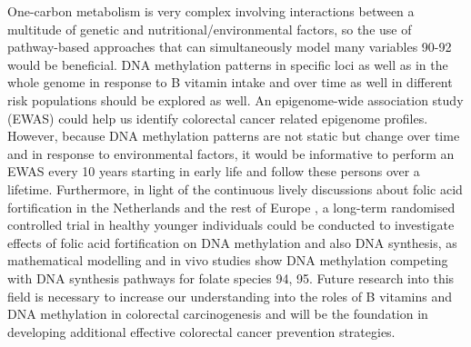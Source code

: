 \noindent One-carbon metabolism is very complex involving interactions between a multitude of genetic and nutritional/environmental factors, so the use of pathway-based approaches that can simultaneously model many variables 90-92 would be beneficial. DNA methylation patterns in specific loci as well as in the whole genome in response to B vitamin intake and over time as well in different risk populations should be explored as well. An epigenome-wide association study (EWAS) could help us identify colorectal cancer related epigenome profiles. However, because DNA methylation patterns are not static but change over time and in response to environmental factors, it would be informative to perform an EWAS every 10 years starting in early life and follow these persons over a lifetime. Furthermore, in light of the continuous lively discussions about folic acid fortification in the Netherlands and the rest of Europe \cite{c793}, a long-term randomised controlled trial in healthy younger individuals could be 
conducted to investigate effects of folic acid fortification on DNA methylation and also DNA synthesis, as mathematical modelling and in vivo studies show DNA methylation competing with DNA synthesis pathways for folate species 94, 95. Future research into this field is necessary to increase our understanding into the roles of B vitamins and DNA methylation in colorectal carcinogenesis and will be the foundation in developing additional effective colorectal cancer prevention strategies. 
 
